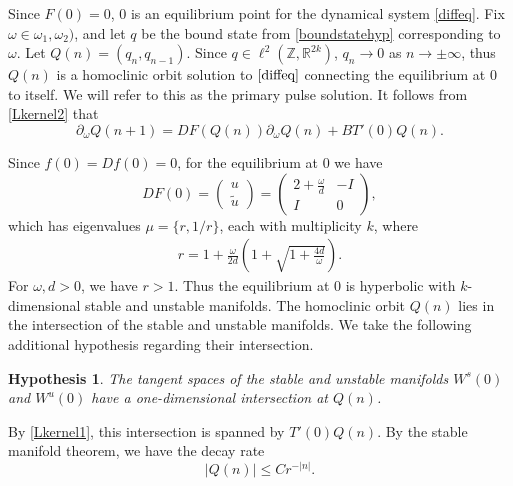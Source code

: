 \documentclass[12pt]{elsarticle}
\def\R{{\mathbb R}}
\def\Z{{\mathbb Z}}
\newtheorem{hypothesis}{Hypothesis}
\begin{document}
Since $F(0) = 0$, 0 is an equilibrium point for the dynamical system \cref{diffeq}. Fix $\omega \in \omega_1, \omega_2)$, and let $q$ be the bound state from \cref{boundstatehyp} corresponding to $\omega$. Let $Q(n) = ( q_n, q_{n-1} )$. Since $q \in \ell^2(\Z, \R^{2k})$, $q_n \rightarrow 0$ as $n \rightarrow \pm \infty$, thus $Q(n)$ is a homoclinic orbit solution to $\cref{diffeq}$ connecting the equilibrium at 0 to itself. We will refer to this as the primary pulse solution. It follows from \cref{Lkernel2} that
\begin{equation}\label{DFkernel2}
\partial_\omega Q(n+1) = DF(Q(n)) \partial_\omega Q(n) + B T'(0)Q(n).
\end{equation}

Since $f(0) = Df(0) = 0$, for the equilibrium at 0 we have
\begin{equation}\label{DF0}
DF(0) = \begin{pmatrix}u \\ \tilde{u} \end{pmatrix} =
\begin{pmatrix}
2 + \frac{\omega}{d} & -I  \\
I & 0
\end{pmatrix} ,
\end{equation}
which has eigenvalues $\mu = \{r, 1/r\}$, each with multiplicity $k$, where
\begin{align}\label{eigr}
r = 1 + \frac{\omega}{2 d} \left( 1 + \sqrt{1 + \frac{4 d}{\omega}} \right).
\end{align}
For $\omega, d > 0$, we have $r > 1$. Thus the equilibrium at 0 is hyperbolic with $k$-dimensional stable and unstable manifolds. The homoclinic orbit $Q(n)$ lies in the intersection of the stable and unstable manifolds. We take the following additional hypothesis regarding their intersection.

\begin{hypothesis}\label{intersectionhyp}
The tangent spaces of the stable and unstable manifolds $W^s(0)$ and $W^u(0)$ have a one-dimensional intersection at $Q(n)$.
\end{hypothesis}

\noindent By \cref{Lkernel1}, this intersection is spanned by $T'(0)Q(n)$. By the stable manifold theorem, we have the decay rate
\begin{equation}\label{Qdecay}
|Q(n)| \leq C r^{-|n|}.
\end{equation}
\end{document}

